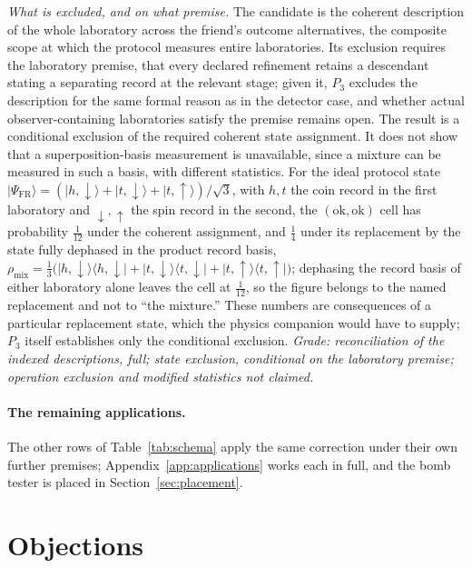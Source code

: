 \textit{What is excluded, and on what premise.} The candidate is the coherent description of the whole laboratory across the friend's outcome alternatives, the composite scope at which the protocol measures entire laboratories. Its exclusion requires the laboratory premise, that every declared refinement retains a descendant stating a separating record at the relevant stage; given it, $P_3$ excludes the description for the same formal reason as in the detector case, and whether actual observer-containing laboratories satisfy the premise remains open. The result is a conditional exclusion of the required coherent state assignment. It does not show that a superposition-basis measurement is unavailable, since a mixture can be measured in such a basis, with different statistics. For the ideal protocol state $|\Psi_{\mathrm{FR}}\rangle = (|h,\downarrow\rangle + |t,\downarrow\rangle + |t,\uparrow\rangle)/\sqrt3$, with $h, t$ the coin record in the first laboratory and $\downarrow, \uparrow$ the spin record in the second, the $(\mathrm{ok}, \mathrm{ok})$ cell has probability $\tfrac{1}{12}$ under the coherent assignment, and $\tfrac14$ under its replacement by the state fully dephased in the product record basis, $\rho_{\mathrm{mix}} = \tfrac13\big(|h,\downarrow\rangle\langle h,\downarrow| + |t,\downarrow\rangle\langle t,\downarrow| + |t,\uparrow\rangle\langle t,\uparrow|\big)$; dephasing the record basis of either laboratory alone leaves the cell at $\tfrac{1}{12}$, so the figure belongs to the named replacement and not to ``the mixture.'' These numbers are consequences of a particular replacement state, which the physics companion would have to supply; $P_3$ itself establishes only the conditional exclusion. \emph{Grade: reconciliation of the indexed descriptions, full; state exclusion, conditional on the laboratory premise; operation exclusion and modified statistics not claimed.}

\paragraph{The remaining applications.} The other rows of Table~\ref{tab:schema} apply the same correction under their own further premises; Appendix~\ref{app:applications} works each in full, and the bomb tester is placed in Section~\ref{sec:placement}.

\section{Objections}\label{sec:objections}


